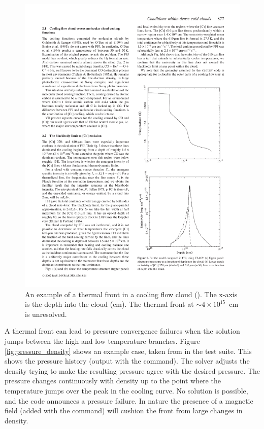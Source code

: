 \begin{figure}
\centering
\includegraphics[scale=1.2]{thermal_front}
\caption[Thermal front example]{\label{fig:thermal_front}An example of a thermal front
in a cooling flow cloud
(\citealp{FerlandFabian2002}). The x-axis is the depth into the cloud (cm).
The thermal front at $\sim 4\times 10^{15}$~cm is unresolved.}
\end{figure}

A thermal front can lead to pressure convergence failures when the
solution jumps between the high and low temperature branches.
Figure \ref{fig:pressure_density}
shows an example case, taken from 
in the test suite.
This shows the pressure history (output with the
 command).
The solver adjusts the density trying to make the resulting
pressure agree with the desired pressure.
The pressure changes continuously
with density up to the point where the temperature jumps over the peak in
the cooling curve.
No solution is possible, and the code announces a
pressure failure.
In nature the presence of a magnetic field (added with
the  command) will cushion the front
from large changes in density.

